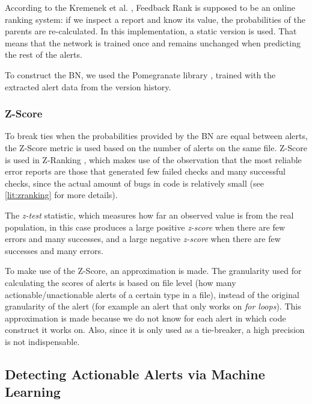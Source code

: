 According to the Kremenek et al. \cite{correlation_exploitation}, Feedback Rank is supposed to be an online ranking system: if we inspect a report and know its value, the probabilities of the parents are re-calculated. In this implementation, a static version is used. That means that the network is trained once and remains unchanged when predicting the rest of the alerts.

To construct the BN, we used the Pomegranate library \cite{pomegranate}, trained with the extracted alert data from the version history. 

\subsubsection{Z-Score}

To break ties when the probabilities provided by the BN are equal between alerts, the Z-Score metric is used based on the number of alerts on the same file. Z-Score is used in Z-Ranking \cite{z-ranking}, which makes use of the observation that the most reliable error reports are those that generated few failed checks and many successful checks, since the actual amount of bugs in code is relatively small (see \cref{lit:zranking} for more details). 

The \textit{z-test} statistic, which measures how far an observed value is from the real population, in this case produces a large positive \textit{z-score} when there are few errors and many successes, and a large negative \textit{z-score} when there are few successes and many errors.

To make use of the Z-Score, an approximation is made. The granularity used for calculating the scores of alerts is based on file level (how many actionable/unactionable alerts of a certain type in a file), instead of the original granularity of the alert (for example an alert that only works on \textit{for loops}). This approximation is made because we do not know for each alert in which code construct it works on. Also, since it is only used as a tie-breaker, a high precision is not indispensable.

\subsection{Detecting Actionable Alerts via Machine Learning}

